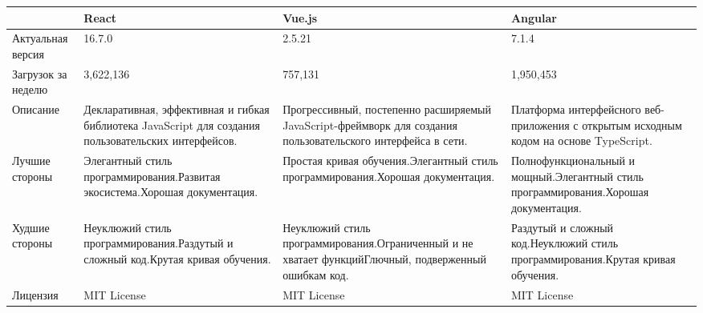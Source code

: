  \hypertarget{app-b}{\label{app-b}}


\begin{table}[H]
  \small
  \begin{tabularx}{\textwidth}{| p{2cm} | X | X | X |}
  \hline
  & React
  & Vue.js
  & Angular \\
  \hline Актуальная версия
  & 16.7.0
  & 2.5.21
  & 7.1.4 \\
  \hline Загрузок за неделю
  & 3,622,136
  & 757,131
  & 1,950,453 \\
  \hline Описание
  & Декларативная, эффективная и гибкая библиотека JavaScript для создания пользовательских интерфейсов.
  & Прогрессивный, постепенно расширяемый JavaScript-фреймворк для создания пользовательского интерфейса в сети.
  & Платформа интерфейсного веб-приложения с открытым исходным кодом на основе TypeScript. \\
  \hline Лучшие стороны
  & Элегантный стиль программирования.\newline Развитая экосистема.\newline Хорошая документация.
  & Простая кривая обучения.\newline Элегантный стиль программирования.\newline Хорошая документация.
  & Полнофункциональный и мощный.\newline Элегантный стиль программирования.\newline Хорошая документация. \\
  \hline Худшие стороны
  & Неуклюжий стиль программирования.\newline Раздутый и сложный код.\newline Крутая кривая обучения.
  & Неуклюжий стиль программирования.\newline Ограниченный и не хватает функций\newline Глючный, подверженный ошибкам код.
  & Раздутый и сложный код.\newline Неуклюжий стиль программирования.\newline Крутая кривая обучения. \\
  \hline Лицензия
  & MIT License
  & MIT License
  & MIT License \\
  \hline
  \end{tabularx}
\end{table}

